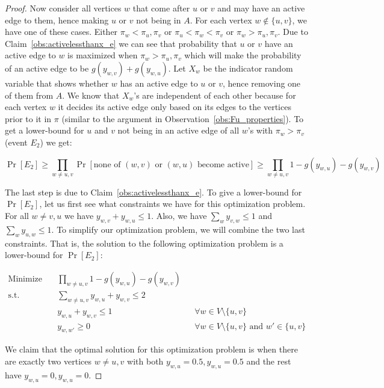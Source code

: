 \documentclass[letterpaper,11pt]{article}
\begin{document}
\begin{proof}
Now consider all vertices $w$ that come after $u$ or $v$ and may have an active edge to them, hence making $u$ or $v$ not being in $A$. For each vertex $w\notin \{u, v\}$, we have  one of these cases. Either $\pi_w < \pi_u, \pi_v$ or $\pi_u < \pi_w < \pi_v$ or $\pi_w > \pi_u, \pi_v$. Due to Claim~\ref{obs:activelessthanx_e} we can see that probability that $u$ or $v$ have an active edge to $w$ is maximized when $\pi_w > \pi_u, \pi_v$ which will make the probability of an active edge to be $g(y_{w, v}) + g(y_{w, u})$. Let $X_w$ be the indicator random variable that shows whether $w$ has an active edge to $u$ or $v$,  hence removing one of them from $A$. We know that $X_w$'s are independent of each other because for each vertex $w$ it decides its active edge only based on its edges to the vertices prior to it in $\pi$ (similar to the argument in Observation~\ref{obs:Fu_properties}). To get a lower-bound for $u$ and $v$ not being in an active edge of all $w$'s with $\pi_w > \pi_v$ (event $E_2$) we get: 

\begin{equation}\label{eq:E2lowerbound}
\Pr[E_2] \geq \prod_{w \neq u, v} \Pr[\text{none of $(w,v)$ or $(w, u)$ become active}] \geq 
\prod_{w \neq u, v} 1 - g(y_{w, u}) - g(y_{w, v})
\end{equation}

The last step is due to Claim~\ref{obs:activelessthanx_e}. To give a lower-bound for $\Pr[E_2]$, let us first see what constraints we have for this optimization problem. For all $w \neq v, u$ we have $y_{w, v} + y_{w, u} \leq 1$. Also, we have $\sum_w y_{v, w} \leq 1$ and $\sum_w y_{u, w} \leq 1$. To simplify our optimization problem, we will combine the two last constraints. That is, the solution to the following optimization problem is a lower-bound for $\Pr[E_2]$:

\begin{align*}
\text{Minimize} \quad &\prod_{w\neq u,v} 1-g(y_{w,u})-g(y_{w,v})&&\\
\text{s.t.} \quad &\sum_{w\neq u,v} y_{w,u}+y_{w,v}\leq 2 &&\\
&y_{w,u}+y_{w,v}\leq 1 &&\forall w\in V\setminus\{u,v\}\\
&y_{w,w'}\geq 0 &&\forall w\in V\setminus\{u,v\} \text{ and } w'\in \{u,v\}
\end{align*}

We claim that the optimal solution for this optimization problem is when there are exactly two vertices $w \neq u, v$ with both  $y_{w, u}=0.5, y_{w, u}=0.5$ and the rest have $y_{w, u}=0, y_{w, u}=0.$ 


\end{proof}
\end{document}
